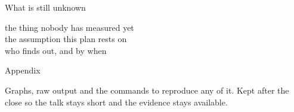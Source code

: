 
\begin{frame}{What is still unknown}
  \begin{console}
   the thing nobody has measured yet\\
   the assumption this plan rests on\\
   who finds out, and by when
  \end{console}
\end{frame}

\begin{frame}{Appendix}
  \begin{console}
  Graphs, raw output and the commands to reproduce any of it. Kept after the close so the
  talk stays short and the evidence stays available.
  \end{console}
\end{frame}

